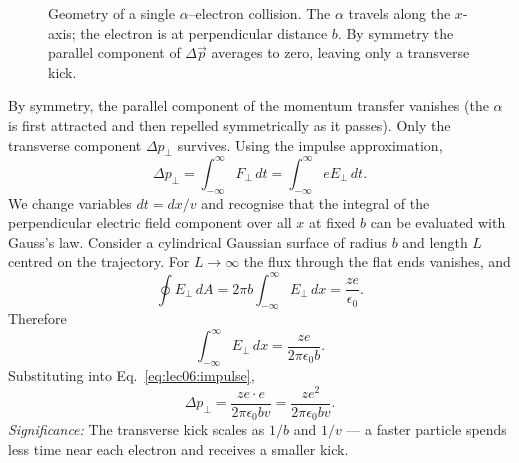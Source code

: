 \begin{figure}[h]
\centering
{}
\caption{Geometry of a single $\alpha$–electron collision.  The $\alpha$ travels
along the $x$-axis; the electron is at perpendicular distance $b$.  By symmetry
the parallel component of $\Delta\vec{p}$ averages to zero, leaving only a
transverse kick.}
\label{fig:lec06:impact}
\end{figure}

By symmetry, the parallel component of the momentum transfer vanishes (the
$\alpha$ is first attracted and then repelled symmetrically as it passes).  Only
the transverse component $\Delta p_\perp$ survives.  Using the impulse
approximation,
\begin{equation}
  \label{eq:lec06:impulse}
  \Delta p_\perp = \int_{-\infty}^{\infty} F_\perp\,dt
    = \int_{-\infty}^{\infty} eE_\perp\,dt.
\end{equation}
We change variables $dt = dx/v$ and recognise that the integral of the
perpendicular electric field component over all $x$ at fixed $b$ can be evaluated
with Gauss's law.  Consider a cylindrical Gaussian surface of radius $b$ and
length $L$ centred on the trajectory.  For $L\to\infty$ the flux through the
flat ends vanishes, and
\begin{equation}
  \label{eq:lec06:gauss}
  \oint E_\perp\,dA = 2\pi b \int_{-\infty}^{\infty} E_\perp\,dx
    = \frac{ze}{\epsilon_0}.
\end{equation}
Therefore
\begin{equation}
  \label{eq:lec06:Ep_integral}
  \int_{-\infty}^{\infty} E_\perp\,dx = \frac{ze}{2\pi\epsilon_0 b}.
\end{equation}
Substituting into Eq.~\eqref{eq:lec06:impulse},
\begin{equation}
  \label{eq:lec06:delta_p}
  \boxed{\Delta p_\perp = \frac{ze \cdot e}{2\pi\epsilon_0 b v}
    = \frac{ze^2}{2\pi\epsilon_0 b v}.}
\end{equation}
\textit{Significance:} The transverse kick scales as $1/b$ and $1/v$ — a faster
particle spends less time near each electron and receives a smaller kick.

